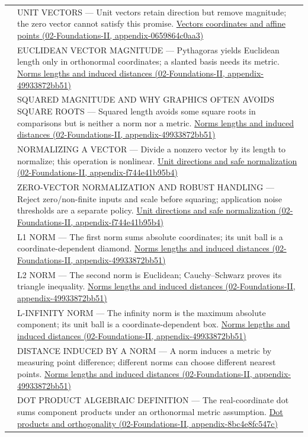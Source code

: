 {\begin{longtable}[]{@{}
  >{\raggedright\arraybackslash}p{}
  >{\raggedright\arraybackslash}p{}@{}}
525 & UNIT VECTORS --- Unit vectors retain direction but remove magnitude; the zero vector cannot satisfy this promise. \href{}{Vectors coordinates and affine points (02-Foundations-II, appendix-0659864c0aa3)} \\
526 & EUCLIDEAN VECTOR MAGNITUDE --- Pythagoras yields Euclidean length only in orthonormal coordinates; a slanted basis needs its metric. \href{}{Norms lengths and induced distances (02-Foundations-II, appendix-49933872bb51)} \\
527 & SQUARED MAGNITUDE AND WHY GRAPHICS OFTEN AVOIDS SQUARE ROOTS --- Squared length avoids some square roots in comparisons but is neither a norm nor a metric. \href{}{Norms lengths and induced distances (02-Foundations-II, appendix-49933872bb51)} \\
528 & NORMALIZING A VECTOR --- Divide a nonzero vector by its length to normalize; this operation is nonlinear. \href{}{Unit directions and safe normalization (02-Foundations-II, appendix-f744e41b95b4)} \\
529 & ZERO-VECTOR NORMALIZATION AND ROBUST HANDLING --- Reject zero/non-finite inputs and scale before squaring; application noise thresholds are a separate policy. \href{}{Unit directions and safe normalization (02-Foundations-II, appendix-f744e41b95b4)} \\
530 & L1 NORM --- The first norm sums absolute coordinates; its unit ball is a coordinate-dependent diamond. \href{}{Norms lengths and induced distances (02-Foundations-II, appendix-49933872bb51)} \\
531 & L2 NORM --- The second norm is Euclidean; Cauchy--Schwarz proves its triangle inequality. \href{}{Norms lengths and induced distances (02-Foundations-II, appendix-49933872bb51)} \\
532 & L-INFINITY NORM --- The infinity norm is the maximum absolute component; its unit ball is a coordinate-dependent box. \href{}{Norms lengths and induced distances (02-Foundations-II, appendix-49933872bb51)} \\
533 & DISTANCE INDUCED BY A NORM --- A norm induces a metric by measuring point difference; different norms can choose different nearest points. \href{}{Norms lengths and induced distances (02-Foundations-II, appendix-49933872bb51)} \\
534 & DOT PRODUCT ALGEBRAIC DEFINITION --- The real-coordinate dot sums component products under an orthonormal metric assumption. \href{}{Dot products and orthogonality (02-Foundations-II, appendix-8bc4e8fc547c)} \\

\end{longtable}}
